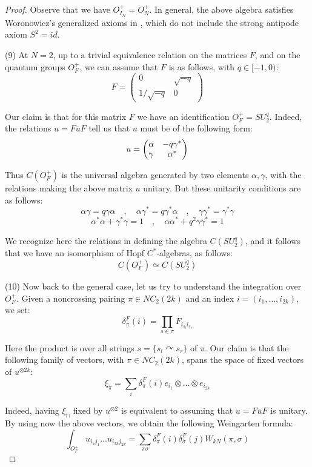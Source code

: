 \documentclass[12pt]{amsbook}
\begin{document}
\begin{proof}
Observe that we have $O_{I_N}^+=O_N^+$. In general, the above algebra satisfies Woronowicz's generalized axioms in \cite{wo1}, which do not include the strong antipode axiom $S^2=id$. 

\medskip

(9) At $N=2$, up to a trivial equivalence relation on the matrices $F$, and on the quantum groups $O_F^+$, we can assume that $F$ is as follows, with $q\in [-1,0)$:
$$F=\begin{pmatrix}0&\sqrt{-q}\\
1/\sqrt{-q}&0\end{pmatrix}$$

Our claim is that for this matrix $F$ we have an identification $O_F^+=SU^q_2$. Indeed, the relations $u=F\bar{u}F$ tell us that $u$ must be of the following form:
$$u=\begin{pmatrix}\alpha&-q\gamma^*\cr \gamma&\alpha^*\end{pmatrix}$$

Thus $C(O_F^+)$ is the universal algebra generated by two elements $\alpha,\gamma$, with the relations making the above matrix $u$ unitary. But these unitarity conditions are as follows:
$$\alpha\gamma=q\gamma\alpha\quad,\quad
\alpha\gamma^*=q\gamma^*\alpha\quad,\quad 
\gamma\gamma^*=\gamma^*\gamma$$
$$\alpha^*\alpha+\gamma^*\gamma=1\quad,\quad 
\alpha\alpha^*+q^2\gamma\gamma^*=1$$

We recognize here the relations in \cite{wo1} defining the algebra $C(SU^q_2)$, and it follows that we have an isomorphism of Hopf $C^*$-algebras, as follows:
$$C(O_F^+)\simeq C(SU^q_2)$$

(10) Now back to the general case, let us try to understand the integration over $O_F^+$. Given a noncrossing pairing $\pi\in NC_2(2k)$ and an index $i=(i_1,\ldots,i_{2k})$, we set:
$$\delta_\pi^F(i)=\prod_{s\in\pi}F_{i_{s_l}i_{s_r}}$$

Here the product is over all strings $s=\{s_l\curvearrowright s_r\}$ of $\pi$. Our claim is that the following family of vectors, with $\pi\in NC_2(2k)$, spans the space of fixed vectors of $u^{\otimes 2k}$:
$$\xi_\pi=\sum_i\delta_\pi^F(i)e_{i_1}\otimes\ldots\otimes e_{i_{2k}}$$ 

Indeed, having $\xi_\cap$ fixed by $u^{\otimes 2}$ is equivalent to assuming that $u=F\bar{u}F$ is unitary. By using now the above vectors, we obtain the following Weingarten formula:
$$\int_{O_F^+}u_{i_1j_1}\ldots u_{i_{2k}j_{2k}}=\sum_{\pi\sigma}\delta_\pi^F(i)\delta_\sigma^F(j)W_{kN}(\pi,\sigma)$$


\end{proof}
\end{document}
